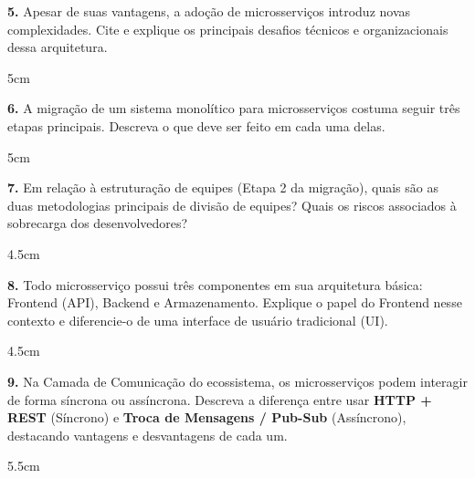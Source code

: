\documentclass[12pt]{article}
\begin{document}
\vspace{0.5cm}

\textbf{5.} Apesar de suas vantagens, a adoção de microsserviços introduz novas complexidades. Cite e explique os principais desafios técnicos e organizacionais dessa arquitetura.
\begin{resposta}{5cm}
\end{resposta}

\vspace{0.5cm}

\textbf{6.} A migração de um sistema monolítico para microsserviços costuma seguir três etapas principais. Descreva o que deve ser feito em cada uma delas.
\begin{resposta}{5cm}
\end{resposta}

\vspace{0.5cm}

\textbf{7.} Em relação à estruturação de equipes (Etapa 2 da migração), quais são as duas metodologias principais de divisão de equipes? Quais os riscos associados à sobrecarga dos desenvolvedores?
\begin{resposta}{4.5cm}
\end{resposta}

\vspace{0.5cm}

\textbf{8.} Todo microsserviço possui três componentes em sua arquitetura básica: Frontend (API), Backend e Armazenamento. Explique o papel do Frontend nesse contexto e diferencie-o de uma interface de usuário tradicional (UI).
\begin{resposta}{4.5cm}
\end{resposta}

\vspace{0.5cm}

\textbf{9.} Na Camada de Comunicação do ecossistema, os microsserviços podem interagir de forma síncrona ou assíncrona. Descreva a diferença entre usar \textbf{HTTP + REST} (Síncrono) e \textbf{Troca de Mensagens / Pub-Sub} (Assíncrono), destacando vantagens e desvantagens de cada um.
\begin{resposta}{5.5cm}
\end{resposta}
\end{document}

